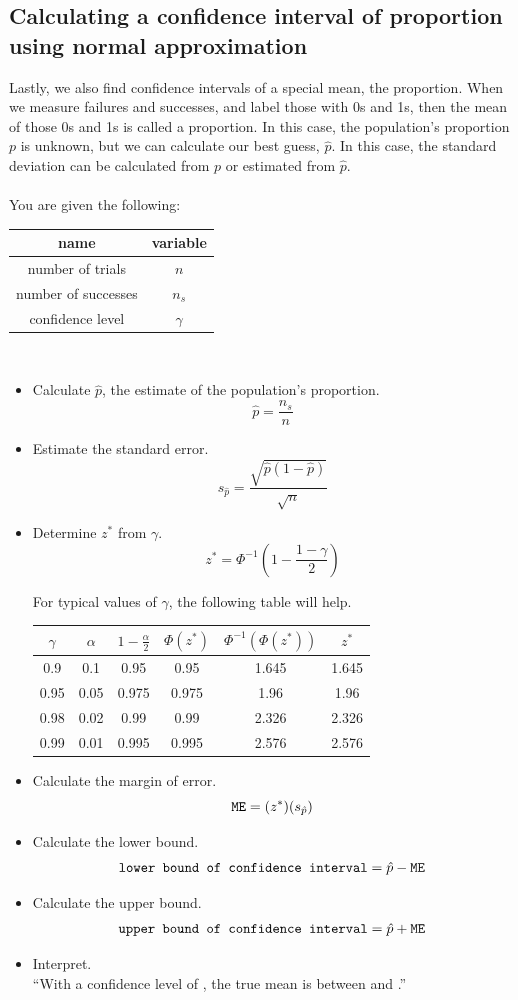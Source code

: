 \documentclass[12pt,letterpaper]{article}
\begin{document}
\newpage
\subsection*{Calculating a confidence interval of proportion using normal approximation}
Lastly, we also find confidence intervals of a special mean, the proportion. When we measure failures and successes, and label those with 0s and 1s, then the mean of those 0s and 1s is called a proportion. In this case, the population's proportion $p$ is unknown, but we can calculate our best guess, $\hat{p}$. In this case, the standard deviation can be calculated from $p$ or estimated from $\hat{p}$.
\\
\\
You are given the following:

\begin{tabular}{|c|c|}\hline
name & variable  \\ \hline
number of trials & $n$  \\
number of successes & $n_s$ \\
confidence level & $\gamma$ \\ \hline
\end{tabular}\\
\begin{itemize}
\item Calculate $\hat{p}$, the estimate of the population's proportion.
$$\hat{p} = \frac{n_s}{n} $$
\item Estimate the standard error.
$$s_{\hat{p}} = \frac{\sqrt{\hat{p}(1-\hat{p})}}{\sqrt{n}} $$
\item Determine $z^*$ from $\gamma$.
$$z^* = \Phi^{-1}\left( 1 - \frac{1-\gamma}{2}\right) $$

For typical values of $\gamma$, the following table will help.
\begin{center}
\begin{tabular}{|c|c|c|c|c|c|}\hline
$\gamma$ & $\alpha$ & $1-\frac{\alpha}{2}$ & $\Phi(z^*)$ & $\Phi^{-1}(\Phi(z^*))$ & $z^*$ \\ \hline
0.9 & 0.1 & 0.95 & 0.95 & 1.645 & 1.645 \\
0.95 & 0.05 & 0.975 & 0.975 & 1.96 & 1.96 \\
0.98 & 0.02 & 0.99 & 0.99 & 2.326 & 2.326\\
0.99 & 0.01 & 0.995 & 0.995 & 2.576 & 2.576\\ \hline
\end{tabular}
\end{center}
\item Calculate the margin of error.
$$\mathtt{ME} = (z^*)(s_{\hat{p}}) $$

\item Calculate the lower bound.
$$\texttt{lower bound of confidence interval} = \hat{p}-\mathtt{ME} $$
\item Calculate the upper bound.
$$\texttt{upper bound of confidence interval} = \hat{p}+\mathtt{ME} $$
\item Interpret.\\
``With a confidence level of \fbox{\phantom{H} $\gamma$ \phantom{H}}, the true mean is between  and .''
\end{itemize}
\end{document}
